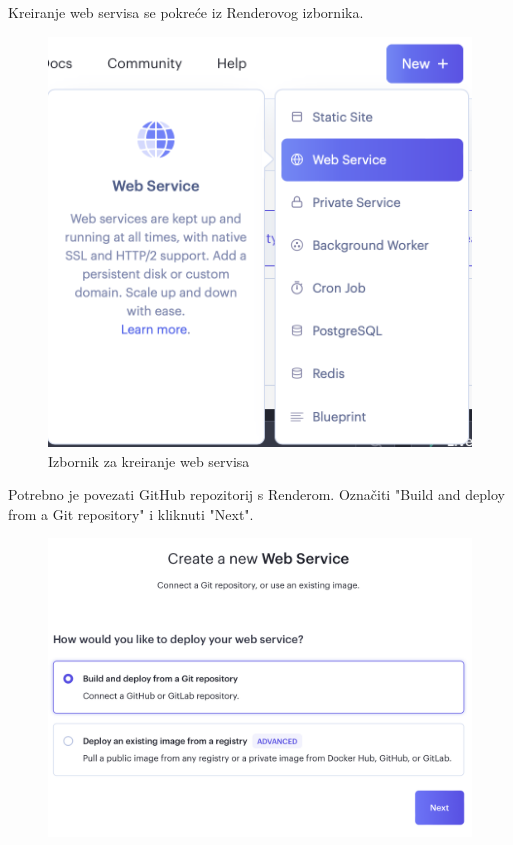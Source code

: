 \begin{enumerate}
			\pagebreak
			Kreiranje web servisa se pokreće iz Renderovog izbornika.
			\begin{figure}[H]
				\includegraphics[scale=0.4]{slike/deploy/backend00.png} %
				\centering
				\caption{Izbornik za kreiranje web servisa}
				\label{fig:promjene}
			\end{figure}
			Potrebno je povezati GitHub repozitorij s Renderom. Označiti "Build and deploy from a Git repository" i kliknuti "Next".
			\begin{figure}[H]
				\includegraphics[scale=0.4]{slike/deploy/backend1.png} %

\end{figure}
\end{enumerate}
